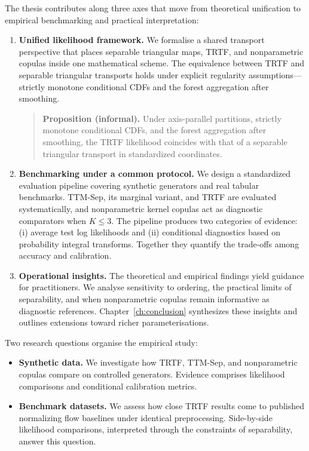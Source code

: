 \documentclass[11pt,a4paper,twoside]{book}\usepackage[]{graphicx}\usepackage[]{xcolor}
\begin{document}
The thesis contributes along three axes that move from theoretical unification to empirical benchmarking and practical interpretation:
\begin{enumerate}
  \item \textbf{Unified likelihood framework.} We formalise a shared transport perspective that places separable triangular maps, TRTF, and nonparametric copulas inside one mathematical scheme. The equivalence between TRTF and separable triangular transports holds under explicit regularity assumptions---strictly monotone conditional CDFs and the forest aggregation after smoothing.

    \begin{quote}
    \textbf{Proposition (informal).} Under axis-parallel partitions, strictly monotone conditional CDFs, and the forest aggregation after smoothing, the TRTF likelihood coincides with that of a separable triangular transport in standardized coordinates.
    \end{quote}

  \item \textbf{Benchmarking under a common protocol.} We design a standardized evaluation pipeline covering synthetic generators and real tabular benchmarks. TTM-Sep, its marginal variant, and TRTF are evaluated systematically, and nonparametric kernel copulas act as diagnostic comparators when $K \le 3$. The pipeline produces two categories of evidence: (i) average test log likelihoods and (ii) conditional diagnostics based on probability integral transforms. Together they quantify the trade-offs among accuracy and calibration.

  \item \textbf{Operational insights.} The theoretical and empirical findings yield guidance for practitioners. We analyse sensitivity to ordering, the practical limits of separability, and when nonparametric copulas remain informative as diagnostic references. Chapter~\ref{ch:conclusion} synthesizes these insights and outlines extensions toward richer parameterisations.
\end{enumerate}

Two research questions organise the empirical study:
\begin{itemize}
  \item \textbf{Synthetic data.} We investigate how TRTF, TTM-Sep, and nonparametric copulas compare on controlled generators. Evidence comprises likelihood comparisons and conditional calibration metrics.
  \item \textbf{Benchmark datasets.} We assess how close TRTF results come to published normalizing flow baselines under identical preprocessing. Side-by-side likelihood comparisons, interpreted through the constraints of separability, answer this question.
\end{itemize}
\end{document}
